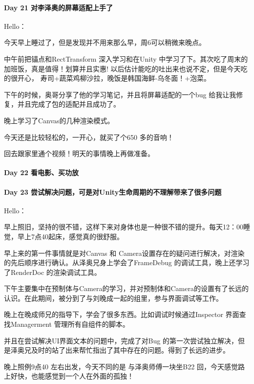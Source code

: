 \documentclass[UTF8,a4paper,8pt]{ctexart}
\begin{document}
 	 \paragraph{Day 21   对李泽奥的屏幕适配上手了   \quad     }
 	 	Hello：
 	 	
 	 	今天早上睡过了，但是发现并不用来那么早，周6可以稍微来晚点。
 	 	
 	 	中午前把锚点和RectTransform 深入学习和在Unity 中学习了下。其次吃了周末的加班饭，真是值得！划算并且实惠! 以后估计能吃的吐出来也说不定，但是今天吃的很开心， 寿司+蔬菜鸡柳沙拉，晚饭是韩国海鲜-乌冬面！+泡菜。
 	 	
 	 	下午的时候，奥哥分享了他的学习笔记，并且将屏幕适配的一个bug 给我让我修复，并且完成了包的适配并且成功了。
 	 	
 	 	晚上学习了Canvas的几种渲染模式。
 	 	
 	 	今天还是比较轻松的，一开心，就买了个650 多的音响！
 	 	
 	 	回去跟家里通个视频！明天的事情晚上再做准备。
 	 \paragraph{Day 22   看电影、买功放   \quad     }
 	 \paragraph{Day 23   尝试解决问题，可是对Unity生命周期的不理解带来了很多问题   \quad     }
 	 	Hello：
 	 	
 	 	早上照旧，坚持的很不错，这样下来对身体也是一种很不错的提升。每天12：00睡觉，早上7点40起床，感觉真的很舒服。
 	 	
 	 	早上来的第一件事情就是对Canvas 和 Camera设置存在的疑问进行解决，对渲染的先后顺序进行确认。从泽奥兄身上学会了FrameDebug 的调试工具，晚上还学习了RenderDoc 的渲染调试工具。
 	 	
 	 	下午主要集中在预制体与Camera的学习，并对预制体和Camera的设置有了长远的认识。在此期间，被分到了与刘晚成一起的组里，参与界面调试等工作。
 	 	
 	 	晚上在晚成师兄的指导下，学会了很多东西。比如调试时候通过Inspector 界面查找Managerment 管理所有自组件的脚本。
 	 	
 	 	并且在尝试解决UI界面文本的问题中，完成了对Bug 的第一次尝试独立解决，但是泽奥兄及时的站了出来帮忙指出了其中存在的问题。得到了长远的进步。
 	 	
 	 	晚上照例9点40 左右出发，今天不同的是 与泽奥师傅一块坐B22 回，今天感觉路上好快，也能感觉到一个人在外面的孤独！
 	 	
\end{document}

